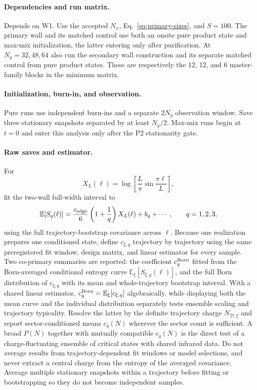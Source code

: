 \documentclass[aps,prx,onecolumn,nofootinbib,superscriptaddress,longbibliography]{revtex4-2}
\newcommand{\E}{\mathbb{E}}
\begin{document}
\paragraph{Dependencies and run matrix.}
Depends on W1.  Use the accepted $N_x$, Eq.~\eqref{eq:primary-sizes}, and $S=100$.  The
primary wall and its matched control use both an onsite pure product state and max-mix
initialization, the latter entering only after purification.  At $N_y=32,48,64$ also run
the secondary wall construction and its separate matched control from pure product states.
These are respectively the 12, 12, and 6 master-family blocks in the minimum matrix.

\paragraph{Initialization, burn-in, and observation.}
Pure runs use independent burn-ins and a separate $2N_y$ observation window.  Save three
stationary snapshots separated by at least $N_y/2$.  Max-mix runs begin at $t=0$ and enter
this analysis only after the P2 stationarity gate.

\paragraph{Raw saves and estimator.}
For
\begin{equation}
 X_L(\ell)=\log\!\left[\frac{L}{\pi}\sin\frac{\pi\ell}{L}\right],
\end{equation}
fit the two-wall full-width interval to
\begin{equation}
 \E[S_q(\ell)]=\frac{c_{\rm edge}}{6}\left(1+\frac1q\right)X_L(\ell)+b_q+\cdots,
 \qquad q=1,2,3,
 \label{eq:renyi}
\end{equation}
using the full trajectory-bootstrap covariance across $\ell$.  Because one realization
prepares one conditioned state, define $c_{\xi,q}$ trajectory by trajectory using the same
preregistered fit window, design matrix, and linear estimator for every sample.  Two
co-primary summaries are reported: the coefficient $c_q^{\rm Born}$ fitted from the
Born-averaged conditional entropy curve $\E_\xi[S_{\xi,q}(\ell)]$, and the full Born
distribution of $c_{\xi,q}$ with its mean and whole-trajectory bootstrap interval.  With a
shared linear estimator, $c_q^{\rm Born}=\E_\xi[c_{\xi,q}]$ algebraically, while displaying
both the mean curve and the individual distribution separately tests ensemble scaling and
trajectory typicality.  Resolve the latter by the definite trajectory charge
$N_{\mathcal D,\xi}$ and report sector-conditioned means $c_q(N)$ wherever the sector count
is sufficient.  A broad $P(N)$ together with mutually compatible $c_q(N)$ is the direct
test of a charge-fluctuating ensemble of critical states with shared infrared data.  Do not
average results from trajectory-dependent fit windows or model selections, and never
extract a central charge from the entropy of the averaged covariance.  Average multiple
stationary snapshots within a trajectory before fitting or bootstrapping so they do not
become independent samples.
\end{document}

